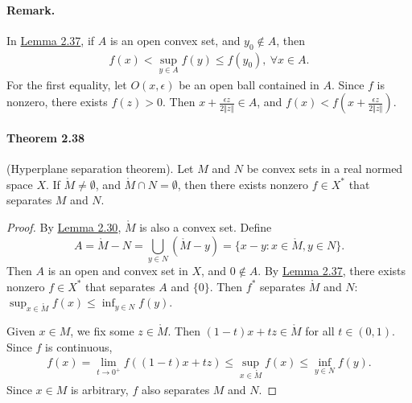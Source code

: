 \documentclass{article}
\begin{document}
\paragraph{Remark.} In \hyperref[lemma:2.37]{Lemma 2.37}, if $A$ is an open convex set, and $y_0\notin A$, then
\begin{align*}
	f(x) < \sup_{y\in A} f(y) \leq f(y_0),\ \forall x\in A.
\end{align*}
For the first equality, let $O(x,\epsilon)$ be an open ball contained in $A$. Since $f$ is nonzero, there exists $f(z) > 0$. Then $x+\frac{\epsilon z}{2\Vert z\Vert}\in A$, and $f(x) < f\left(x+\frac{\epsilon z}{2\Vert z\Vert}\right)$.

\paragraph{Theorem 2.38\label{thm:2.38}} (Hyperplane separation theorem). Let $M$ and $N$ be convex sets in a real normed space $X$. If $\mathring{M}\neq\emptyset$, and $\mathring{M}\cap N=\emptyset$, then there exists nonzero $f\in X^*$ that separates $M$ and $N$.
\begin{proof}
By \hyperref[lemma:2.30]{Lemma 2.30}, $\mathring{M}$ is also a convex set. Define 
$$A=\mathring{M}-N = \bigcup_{y\in N} (\mathring{M}-y)=\{x-y:x\in\mathring{M},y\in N\}.$$
Then $A$ is an open and convex set in $X$, and $0\notin A$. By \hyperref[lemma:2.37]{Lemma 2.37}, there exists nonzero $f\in X^*$ that separates $A$ and $\{0\}$. Then $f^*$ separates $\mathring{M}$ and $N$: $\sup_{x\in\mathring{M}} f(x) \leq \inf_{y\in N}f(y)$.
\vspace{0.1cm}

Given $x\in M$, we fix some $z\in\mathring{M}$. Then $(1-t)x+tz\in\mathring{M}$ for all $t\in(0,1)$. Since $f$ is continuous,
\begin{align*}
	f(x) = \lim_{t\to 0^+} f\left((1-t)x+tz\right)\leq \sup_{x\in\mathring{M}} f(x) \leq \inf_{y\in N}f(y).
\end{align*}
Since $x\in M$ is arbitrary, $f$ also separates $M$ and $N$.
\end{proof}
\end{document}
